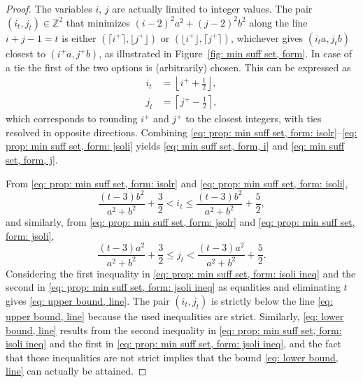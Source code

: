 \documentclass[12pt, a4paper]{article}
\newcommand{\tiles}{t} %
\newcommand{\isolr}{i^+}
\newcommand{\jsolr}{j^+}
\begin{document}
\begin{proof}
The variables $i$, $j$ are actually limited to integer values. The pair $(i_\tiles, j_\tiles) \in \mathbb Z^2$ that minimizes $(i-2)^2 a^2 + (j-2)^2 b^2$ along the line $i+j-1=\tiles$ is either $(\lceil \isolr \rceil, \lfloor \jsolr \rfloor)$ or $(\lfloor \isolr \rfloor, \lceil \jsolr \rceil)$, whichever gives $(i_\tiles a, j_\tiles b)$ closest to $(\isolr a, \jsolr b)$, as illustrated in Figure~\ref{fig: min suff set, form}. In case of a tie the first of the two options is (arbitrarily) chosen. This can be expressed as
\begin{align}
\label{eq: prop: min suff set, form: isoli}
i_\tiles &= \left\lfloor \isolr + \frac 1 2 \right\rfloor, \\
\label{eq: prop: min suff set, form: jsoli}
j_\tiles &= \left\lceil \jsolr - \frac 1 2 \right\rceil,
\end{align}
which corresponds to rounding $\isolr$ and $\jsolr$ to the closest integers, with ties resolved in opposite directions. Combining \eqref{eq: prop: min suff set, form: isolr}--\eqref{eq: prop: min suff set, form: jsoli}
yields \eqref{eq: min suff set, form, i} and \eqref{eq: min suff set, form, j}.

From \eqref{eq: prop: min suff set, form: isolr} and \eqref{eq: prop: min suff set, form: isoli},
\begin{equation}
\label{eq: prop: min suff set, form: isoli ineq}
\frac{(\tiles-3)b^2}{a^2+b^2} + \frac 3 2 < i_\tiles \leq \frac{(\tiles-3)b^2}{a^2+b^2} + \frac 5 2,
\end{equation}
and similarly, from \eqref{eq: prop: min suff set, form: jsolr} and \eqref{eq: prop: min suff set, form: jsoli},
\begin{equation}
\label{eq: prop: min suff set, form: jsoli ineq}
\frac{(\tiles-3)a^2}{a^2+b^2} + \frac 3 2 \leq j_\tiles < \frac{(\tiles-3)a^2}{a^2+b^2} + \frac 5 2.
\end{equation}
Considering the first inequality in \eqref{eq: prop: min suff set, form: isoli ineq} and the second in \eqref{eq: prop: min suff set, form: jsoli ineq} as equalities and eliminating $\tiles$ gives \eqref{eq: upper bound, line}. The pair $(i_\tiles, j_\tiles)$ is strictly below the line \eqref{eq: upper bound, line} because the used inequalities are strict. Similarly, \eqref{eq: lower bound, line} results from the second inequality in \eqref{eq: prop: min suff set, form: isoli ineq} and the first in \eqref{eq: prop: min suff set, form: jsoli ineq}, and the fact that those inequalities are not strict implies that the bound \eqref{eq: lower bound, line} can actually be attained.
\end{proof}
\end{document}
